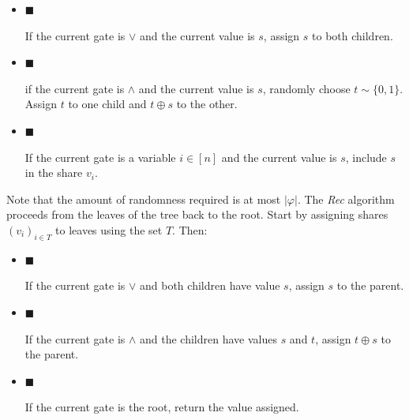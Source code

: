 \begin{itemize}


\item[] 
$\blacksquare$ 


If the current gate is $\lor$ and the current value is $s$, assign $s$ to both children.\par





\item[] 
$\blacksquare$ 


if the current gate is $\land$ and the current value is $s$, randomly choose $t\sim\{0,1\}$. Assign $t$ to one child and $t\oplus s$ to the other.\par





\item[] 
$\blacksquare$ 


If the current gate is a variable $i\in[n]$ and the current value is $s$, include $s$ in the share $v_{i}$.\par





\end{itemize}


Note that the amount of randomness required is at most $|\varphi|$. The \emph{Rec} algorithm proceeds from the leaves of the tree back to the root. Start by assigning shares $(v_{i})_{i\in T}$ to leaves using the set $T$. Then:\par


\begin{itemize}


\item[] 
$\blacksquare$ 


If the current gate is $\lor$ and both children have value $s$, assign $s$ to the parent.\par





\item[] 
$\blacksquare$ 


If the current gate is $\land$ and the children have values $s$ and $t$, assign $t\oplus s$ to the parent.\par





\item[] 
$\blacksquare$ 


If the current gate is the root, return the value assigned.\par





\end{itemize}


